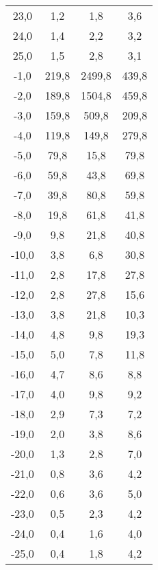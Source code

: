 \begin{center}
\begin{longtable}{c c c c }
  23,0 & 1,2   &    1,8 &    3,6\\
  24,0 & 1,4   &    2,2 &    3,2\\
  25,0 & 1,5   &    2,8 &    3,1\\
  -1,0 & 219,8 & 2499,8 &  439,8\\
  -2,0 & 189,8 & 1504,8 &  459,8\\
  -3,0 & 159,8 &  509,8 &  209,8\\
  -4,0 & 119,8 &  149,8 &  279,8\\
  -5,0 & 79,8  &   15,8 &   79,8\\
  -6,0 & 59,8  &   43,8 &   69,8\\
  -7,0 & 39,8  &   80,8 &   59,8\\
  -8,0 & 19,8  &   61,8 &   41,8\\
  -9,0 & 9,8   &   21,8 &   40,8\\
  -10,0 & 3,8  &    6,8 &   30,8\\
  -11,0 & 2,8  &   17,8 &   27,8\\
  -12,0 & 2,8  &   27,8 &   15,6\\
  -13,0 & 3,8  &   21,8 &   10,3\\
  -14,0 & 4,8  &   9,8 &    19,3\\
  -15,0 & 5,0  &   7,8 &    11,8\\
  -16,0 & 4,7  &   8,6 &     8,8\\
  -17,0 & 4,0  &   9,8 &     9,2\\
  -18,0 & 2,9  &   7,3 &     7,2\\
  -19,0 & 2,0  &   3,8 &     8,6\\
  -20,0 & 1,3  &   2,8 &     7,0\\
  -21,0 & 0,8  &   3,6 &     4,2\\
  -22,0 & 0,6  &   3,6 &     5,0\\
  -23,0 & 0,5  &   2,3 &     4,2\\
  -24,0 & 0,4  &   1,6 &     4,0\\
  -25,0 & 0,4  &   1,8 &     4,2\\
  \end{longtable}
  \end{center}












